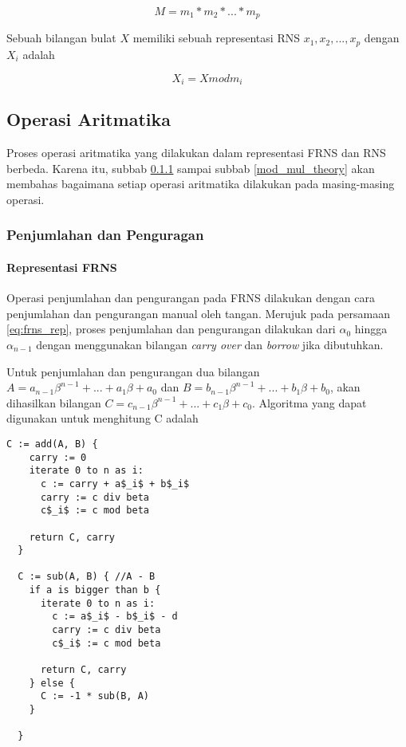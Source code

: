 \begin{equation}
  M = m_1 * m_2 * ... * m_p
\end{equation}

Sebuah bilangan bulat $X$ memiliki sebuah representasi RNS ${x_1,x_2,...,x_p}$ dengan $X_i$ adalah

\begin{equation}
  X_i = X mod m_i
\end{equation}


\subsection{Operasi Aritmatika}
Proses operasi aritmatika yang dilakukan dalam representasi FRNS dan RNS berbeda. Karena itu, subbab \ref{add_sub_theory} sampai subbab \ref{mod_mul_theory} akan membahas bagaimana setiap operasi aritmatika dilakukan pada masing-masing operasi.

\subsubsection{Penjumlahan dan Penguragan} \label{add_sub_theory}
\paragraph{Representasi FRNS}

Operasi penjumlahan dan pengurangan pada FRNS dilakukan dengan cara penjumlahan dan pengurangan manual oleh tangan. Merujuk pada persamaan \ref{eq:frns_rep}, proses penjumlahan dan pengurangan dilakukan dari $\alpha_0$ hingga $\alpha_{n-1}$ dengan menggunakan bilangan \textit{carry over} dan \textit{borrow} jika dibutuhkan.

Untuk penjumlahan dan pengurangan dua bilangan $A = a_{n-1}\beta^{n-1}+...+a_{1}\beta+a_{0}$ dan $B = b_{n-1}\beta^{n-1}+...+b_{1}\beta+b_{0}$, akan dihasilkan bilangan $C = c_{n-1}\beta^{n-1}+...+c_{1}\beta+c_{0}$. Algoritma yang dapat digunakan untuk menghitung C adalah

\begin{lstlisting}[basicstyle=\linespread{1.25}\footnotesize\rmfamily]
  C := add(A, B) {
    carry := 0
    iterate 0 to n as i:
      c := carry + a$_i$ + b$_i$
      carry := c div beta
      c$_i$ := c mod beta

    return C, carry
  }

  C := sub(A, B) { //A - B
    if a is bigger than b {
      iterate 0 to n as i:
        c := a$_i$ - b$_i$ - d
        carry := c div beta
        c$_i$ := c mod beta

      return C, carry
    } else {
      C := -1 * sub(B, A)
    }

  }
\end{lstlisting}

